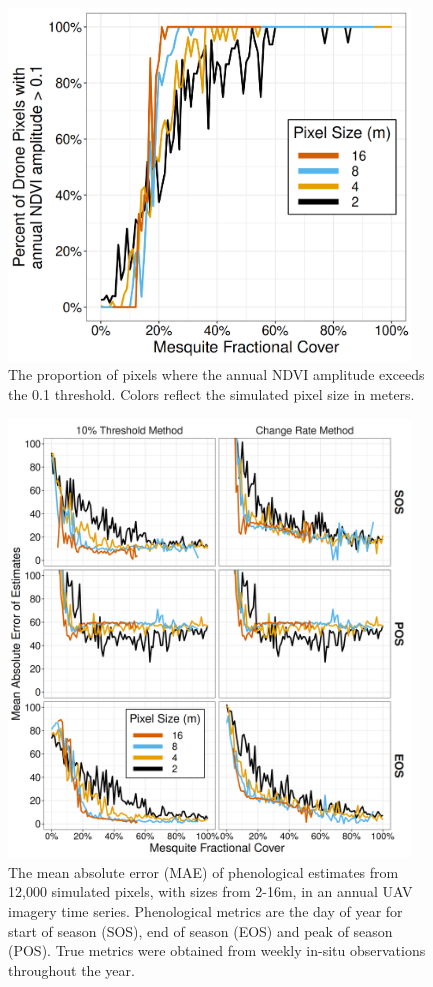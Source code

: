 \documentclass{article}
\begin{document}
\begin{figure}[h]
    \centering
    \includegraphics[width=0.95\textwidth]{figures/fig4_drone_detectability.png}
    \caption{The proportion of pixels where the annual NDVI amplitude exceeds the 0.1 threshold. Colors reflect the simulated pixel size in meters.}
    \label{fig4}
\end{figure}

\begin{figure}[h]
    \centering
    \includegraphics[width=0.95\textwidth]{figures/fig5_drone_mae.png}
    \caption{The mean absolute error (MAE) of phenological estimates from 12,000 simulated pixels, with sizes from 2-16m,  in an annual UAV imagery time series. Phenological metrics are the day of year for start of season (SOS), end of season (EOS) and peak of season (POS). True metrics were obtained from weekly in-situ observations throughout the year.}
    \label{fig5}
\end{figure}
\end{document}
